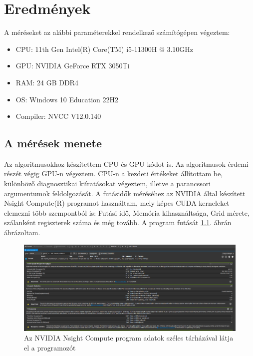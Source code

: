 \chapter{Eredmények} \label{resultsChapter}

A méréseket az alábbi paraméterekkel rendelkező számítógépen végeztem:
\begin{itemize}
	\item	CPU: 11th Gen Intel(R) Core(TM) i5-11300H @ 3.10GHz
	\item	GPU: NVIDIA GeForce RTX 3050Ti 
	\item	RAM: 24 GB DDR4 
	\item	OS: Windows 10 Education 22H2 
	\item	Compiler: NVCC V12.0.140
	
\end{itemize}

\section{A mérések menete}
Az algoritmusokhoz készítettem CPU és GPU kódot is. Az algoritmusok érdemi részét végig GPU-n végeztem. CPU-n a kezdeti értékeket állítottam be, különböző diagnosztikai kiíratásokat végeztem, illetve a parancssori argumentumok feldolgozását. A futásidők méréséhez az NVIDIA által készített Nsight Compute(R) programot használtam, mely képes CUDA kerneleket elemezni több szempontból is: Futási idő, Memória kihasználtsága, Grid mérete, szálanként regiszterek száma és még tovább. A program futását \ref{fig:nsight-compute}. ábrán ábrázoltam. 

\begin{figure}[ht!]
	\centering
	\includegraphics[width=150mm, keepaspectratio]{figures/nsight-compute.png}
	\caption{Az NVIDIA Nsight Compute program adatok széles tárházával látja el a programozót }
	\label{fig:nsight-compute}
\end{figure}


